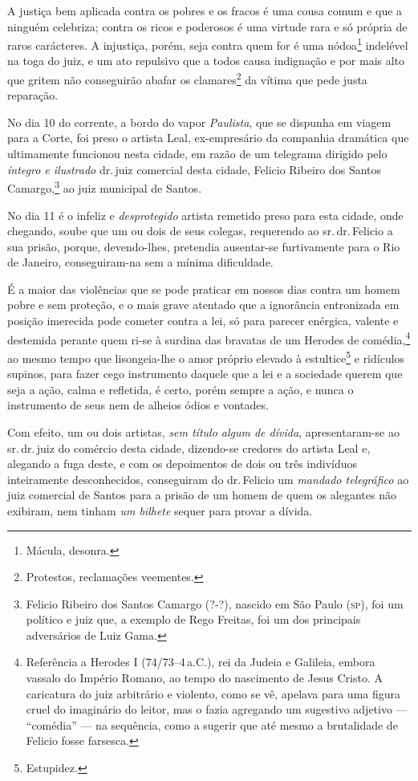 A justiça bem aplicada contra os pobres e os fracos é uma cousa comum e
que a ninguém celebriza; contra os ricos e poderosos é uma virtude rara
e só própria de raros carácteres. A injustiça, porém, seja contra quem
for é uma nódoa\footnote{ Mácula, desonra.} indelével na toga do juiz,
e um ato repulsivo que a todos causa indignação e por mais alto que
gritem não conseguirão abafar os clamares\footnote{ Protestos,
  reclamações veementes.} da vítima que pede justa reparação.

No dia 10 do corrente, a bordo do vapor \emph{Paulista}, que se dispunha
em viagem para a Corte, foi preso o artista Leal, ex-empresário da
companhia dramática que ultimamente funcionou nesta cidade, em razão de
um telegrama dirigido pelo \emph{íntegro e ilustrado} dr.\,juiz comercial
desta cidade, Felicio Ribeiro dos Santos Camargo,\footnote{ Felicio
  Ribeiro dos Santos Camargo (?-?), nascido em São Paulo (\textsc{sp}), foi um
  político e juiz que, a exemplo de Rego Freitas, foi um dos principais
  adversários de Luiz Gama.} ao juiz municipal de Santos.

No dia 11 é o infeliz e \emph{desprotegido} artista remetido preso para
esta cidade, onde chegando, soube que um ou dois de seus colegas,
requerendo ao sr.\,dr.\,Felicio a sua prisão, porque, devendo-lhes,
pretendia ausentar-se furtivamente para o Rio de Janeiro, conseguiram-na
sem a mínima dificuldade.

É a maior das violências que se pode praticar em nossos dias contra um
homem pobre e sem proteção, e o mais grave atentado que a ignorância
entronizada em posição imerecida pode cometer contra a lei, só para
parecer enérgica, valente e destemida perante quem ri-se à surdina das
bravatas de um Herodes de comédia,\footnote{ Referência a Herodes I
  (74/73--4\,a.C.), rei da Judeia e Galileia, embora vassalo do
  Império Romano, ao tempo do nascimento de Jesus Cristo. A caricatura
  do juiz arbitrário e violento, como se vê, apelava para uma figura
  cruel do imaginário do leitor, mas o fazia agregando um sugestivo
  adjetivo --- ``comédia'' --- na sequência, como a sugerir que até mesmo a
  brutalidade de Felicio fosse farsesca.} ao mesmo tempo que
lisongeia-lhe o amor próprio elevado à estultice\footnote{ Estupidez.}
e ridículos supinos, para fazer cego instrumento daquele que a lei e a
sociedade querem que seja a ação, calma e refletida, é certo, porém
sempre a ação, e nunca o instrumento de seus nem de alheios ódios e
vontades.

Com efeito, um ou dois artistas, \emph{sem título algum de dívida},
apresentaram-se ao sr.\,dr.\,juiz do comércio desta cidade, dizendo-se
credores do artista Leal e, alegando a fuga deste, e com os depoimentos
de dois ou três indivíduos inteiramente desconhecidos, conseguiram do
dr.\,Felicio um \emph{mandado telegráfico} ao juiz comercial de Santos
para a prisão de um homem de quem os alegantes não exibiram, nem tinham
\emph{um bilhete} sequer para provar a dívida.

